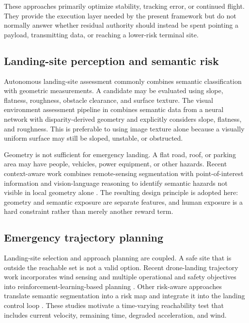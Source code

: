 \documentclass[conference]{IEEEtran}
\begin{document}
These approaches primarily optimize stability, tracking error, or continued
flight. They provide the execution layer needed by the present framework but
do not normally answer whether residual authority should instead be spent
pointing a payload, transmitting data, or reaching a lower-risk terminal site.

\subsection{Landing-site perception and semantic risk}
Autonomous landing-site assessment commonly combines semantic classification
with geometric measurements. A candidate may be evaluated using slope,
flatness, roughness, obstacle clearance, and surface texture. The visual
environment assessment pipeline in \cite{visualLanding2024} combines
semantic data from a neural network with disparity-derived geometry and
explicitly considers slope, flatness, and roughness. This is preferable to
using image texture alone because a visually uniform surface may still be
sloped, unstable, or obstructed.

Geometry is not sufficient for emergency landing. A flat road, roof, or
parking area may have people, vehicles, power equipment, or other hazards.
Recent context-aware work combines remote-sensing segmentation with
point-of-interest information and vision-language reasoning to identify
semantic hazards not visible in local geometry alone
\cite{hua2026elss}. The resulting design principle is adopted here: geometry
and semantic exposure are separate features, and human exposure is a hard
constraint rather than merely another reward term.

\subsection{Emergency trajectory planning}
Landing-site selection and approach planning are coupled. A safe site that is
outside the reachable set is not a valid option. Recent drone-landing
trajectory work incorporates wind sensing and multiple operational and safety
objectives into reinforcement-learning-based planning
\cite{wang2025wind}. Other risk-aware approaches translate semantic
segmentation into a risk map and integrate it into the landing control loop
\cite{zhang2026risk}. These studies motivate a time-varying reachability test
that includes current velocity, remaining time, degraded acceleration, and
wind.
\end{document}
